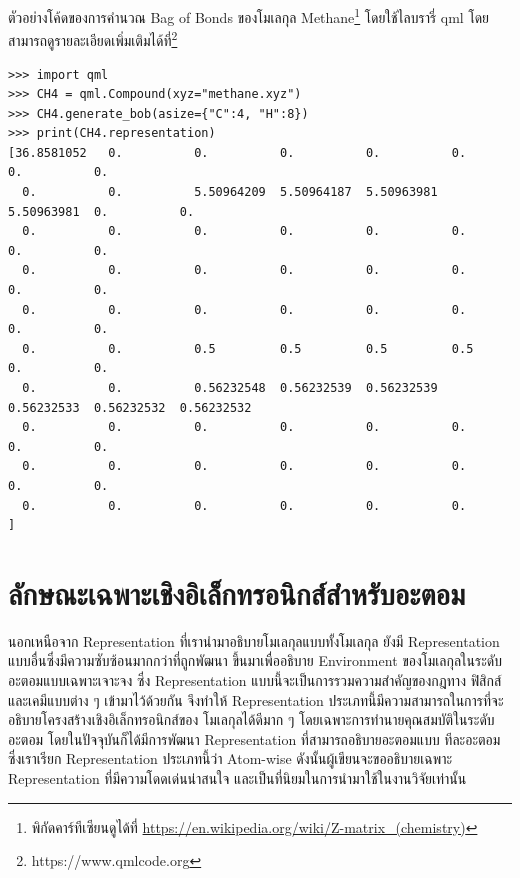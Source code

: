 ตัวอย่างโค้ดของการคำนวณ Bag of Bonds ของโมเลกุล Methane\footnote{พิกัดคาร์ทีเซียนดูได้ที่ 
\url{https://en.wikipedia.org/wiki/Z-matrix_(chemistry)}} โดยใช้ไลบรารี่ qml\autocite{zotero-1799} 
โดยสามารถดูรายละเอียดเพิ่มเติมได้ที่\footnote{https://www.qmlcode.org}

\begin{lstlisting}[style=MyPython]
>>> import qml
>>> CH4 = qml.Compound(xyz="methane.xyz")
>>> CH4.generate_bob(asize={"C":4, "H":8})
>>> print(CH4.representation)
[36.8581052   0.          0.          0.          0.          0.          0.          0.
  0.          0.          5.50964209  5.50964187  5.50963981  5.50963981  0.          0.
  0.          0.          0.          0.          0.          0.          0.          0.
  0.          0.          0.          0.          0.          0.          0.          0.
  0.          0.          0.          0.          0.          0.          0.          0.
  0.          0.          0.5         0.5         0.5         0.5         0.          0.
  0.          0.          0.56232548  0.56232539  0.56232539  0.56232533  0.56232532  0.56232532
  0.          0.          0.          0.          0.          0.          0.          0.
  0.          0.          0.          0.          0.          0.          0.          0.
  0.          0.          0.          0.          0.          0.        ]
\end{lstlisting}

\section{ลักษณะเฉพาะเชิงอิเล็กทรอนิกส์สำหรับอะตอม}
\label{sec:elec_feat}

นอกเหนือจาก Representation ที่เรานำมาอธิบายโมเลกุลแบบทั้งโมเลกุล ยังมี Representation แบบอื่นซึ่งมีความซับซ้อนมากกว่าที่ถูกพัฒนา%
ขึ้นมาเพื่ออธิบาย Environment ของโมเลกุลในระดับอะตอมแบบเฉพาะเจาะจง ซึ่ง Representation แบบนี้จะเป็นการรวมความสำคัญของกฎทาง%
ฟิสิกส์และเคมีแบบต่าง ๆ เข้ามาไว้ด้วยกัน จึงทำให้ Representation ประเภทนี้มีความสามารถในการที่จะอธิบายโครงสร้างเชิงอิเล็กทรอนิกส์ของ%
โมเลกุลได้ดีมาก ๆ โดยเฉพาะการทำนายคุณสมบัติในระดับอะตอม โดยในปัจจุบันก็ได้มีการพัฒนา Representation ที่สามารถอธิบายอะตอมแบบ%
ทีละอะตอม ซึ่งเราเรียก Representation ประเภทนี้ว่า Atom-wise ดังนั้นผู้เขียนจะขออธิบายเฉพาะ Representation ที่มีความโดดเด่นน่าสนใจ%
และเป็นที่นิยมในการนำมาใช้ในงานวิจัยเท่านั้น

